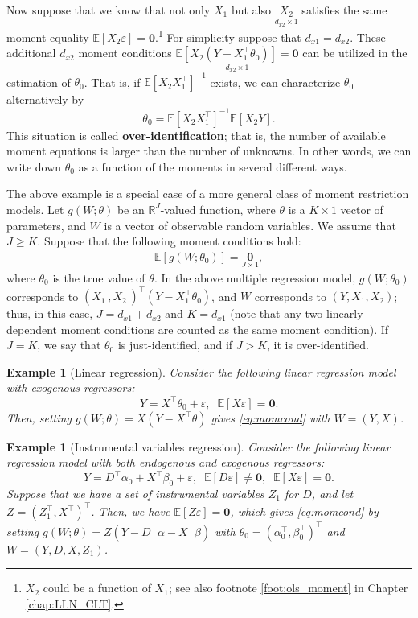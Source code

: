 \documentclass[10.5pt, A4paper, openany, uplatex]{book}
\newcommand{\mbf}{\mathbf}
\newcommand{\mbb}{\mathbb}
\newcommand{\eps}{\varepsilon}
\newcommand{\E}{\mathbb{E}}
\newtheorem{example}[theorem]{Example}
\numberwithin{equation}{section}
\begin{document}
Now suppose that we know that not only $X_1$ but also $\underset{d_{x2} \times 1}{X_2}$ satisfies the same moment equality $\E [X_2 \eps] = \mbf{0}$.\footnote{$X_2$ could be a function of $X_1$; see also footnote \ref{foot:ols_moment} in Chapter \ref{chap:LLN_CLT}.}
For simplicity suppose that $d_{x1} = d_{x2}$.
These additional $d_{x2}$ moment conditions $\underset{d_{x2} \times 1}{\E[X_2 (Y - X_1^\top \theta_0)] = \mbf{0}}$ can be utilized in the estimation of $\theta_0$.
That is, if $\E [X_2X_1^\top]^{-1}$ exists, we can characterize $\theta_0$ alternatively by
\[
	\theta_0 = \E[X_2 X_1^\top]^{-1} \E[X_2 Y].
\]
This situation is called \textbf{over-identification}; that is, the number of available moment equations is larger than the number of unknowns.
In other words, we can write down $\theta_0$ as a function of the moments in several different ways. 
\bigskip

The above example is a special case of a more general class of moment restriction models.
Let $g(W; \theta)$ be an $\mbb{R}^J$-valued function, where $\theta$ is a $K \times 1$ vector of parameters, and $W$ is a vector of observable random variables.
We assume that $J \geq K$.
Suppose that the following moment conditions hold:
\begin{align}\label{eq:momcond}
	\E[g(W; \theta_0)] = \underset{J \times 1}{\mbf{0}},
\end{align}
where $\theta_0$ is the true value of $\theta$.
In the above multiple regression model, $g(W; \theta_0)$ corresponds to $(X_1^\top, X_2^\top)^\top (Y - X_1^\top\theta_0)$, and $W$ corresponds to $(Y, X_1, X_2)$; thus, in this case, $J = d_{x1} + d_{x2}$ and $K = d_{x1}$ (note that any two linearly dependent moment conditions are counted as the same moment condition).
If $J = K$, we say that $\theta_0$ is just-identified, and if $J > K$, it is over-identified.

\begin{example}[Linear regression]\label{ex:ols}\upshape
	Consider the following linear regression model with exogenous regressors:
	\[
	Y = X^\top\theta_0 + \eps, \;\; \E[X \eps] = \mbf{0}.
	\]
	Then, setting $g(W; \theta) = X( Y - X^\top\theta)$ gives \eqref{eq:momcond} with $W = (Y,X)$.
\end{example}

\begin{example}[Instrumental variables regression]\label{ex:2sls}\upshape
	Consider the following linear regression model with both endogenous and exogenous regressors:
	\[
	Y = D^\top\alpha_0 + X^\top\beta_0 + \eps, \;\; \E[D \eps] \neq \mbf{0}, \;\; \E[X \eps] = \mbf{0}.
	\]
	Suppose that we have a set of instrumental variables $Z_1$ for $D$, and let $Z = (Z_1^\top, X^\top)^\top$.
	Then, we have $\E [Z \eps] = \mbf{0}$, which gives \eqref{eq:momcond} by setting $g(W; \theta) = Z( Y - D^\top\alpha - X^\top\beta)$ with $\theta_0 = (\alpha_0^\top, \beta_0^\top)^\top$ and $W = (Y,D,X,Z_1)$.
\end{example}
\end{document}
